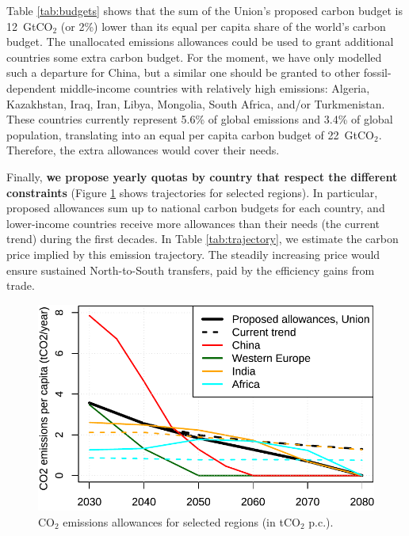 \documentclass[12pt,english]{article}
\begin{document}
Table \ref{tab:budgets} shows that the sum of the Union's proposed carbon budget is 12~GtCO$_\text{2}$ (or 2\%) lower than its equal per capita share of the world's carbon budget. The unallocated emissions allowances could be used to grant additional countries some extra carbon budget. For the moment, we have only modelled such a departure for China, but a similar one should be granted to other fossil-dependent middle-income countries with relatively high emissions: Algeria, Kazakhstan, Iraq, Iran, Libya, Mongolia, South Africa, and/or Turkmenistan. %
These countries currently represent 5.6\% of global emissions and 3.4\% of global population, translating into an equal per capita carbon budget of 22~GtCO$_\text{2}$. Therefore, the extra allowances would cover their needs. 

Finally, \textbf{we propose yearly quotas by country that respect the different constraints} (Figure \ref{fig:trajectories} shows trajectories for selected regions). 
In particular, proposed allowances sum up to national carbon budgets for each country, and lower-income countries receive more allowances than their needs (the current trend) 
during the first decades. %
In Table \ref{tab:trajectory}, we estimate the carbon price implied by this emission trajectory. The steadily increasing price would ensure sustained North-to-South transfers, paid by the efficiency gains from trade.

\begin{figure}[h]
  \centering \caption{CO$_\text{2}$ emissions allowances for selected regions (in tCO$_\text{2}$ p.c.).\label{fig:trajectories}}
  \includegraphics[width=.7\textwidth]{../figures/policies/fossil_free_union_emission_trajectories.pdf} 
\end{figure}

\begin{table}[h!]
  \caption{Projected carbon price trajectory in the Union.\label{tab:trajectory}} 
\end{table}
\end{document}
